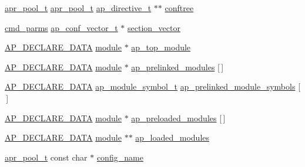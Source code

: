 \begin{DoxyCompactItemize}
\hyperlink{structapr__pool__t}{apr\+\_\+pool\+\_\+t} \hyperlink{structapr__pool__t}{apr\+\_\+pool\+\_\+t} \hyperlink{structap__directive__t}{ap\+\_\+directive\+\_\+t} $\ast$$\ast$ \hyperlink{group__APACHE__CORE__CONFIG_gafb5c2ed2ff2c064ef1b2c1f8bf52e112}{conftree}
\item 
\hyperlink{group__APACHE__CORE__CONFIG_ga1791fbd28d06a9847bad001541c5241e}{cmd\+\_\+parms} \hyperlink{group__APACHE__CORE__CONFIG_ga614684670dbf748a70ac6bad272da59c}{ap\+\_\+conf\+\_\+vector\+\_\+t} $\ast$ \hyperlink{group__APACHE__CORE__CONFIG_gace60c7b728bdd9607d750e86cf9414c9}{section\+\_\+vector}
\item 
\hyperlink{ap__config_8h_a0bb4c3adf74510a0dcdad5b125725fe0}{A\+P\+\_\+\+D\+E\+C\+L\+A\+R\+E\+\_\+\+D\+A\+TA} \hyperlink{group__APACHE__CORE__CONFIG_ga0ea4f633a5f9f88e1603aaeb1f2b2e69}{module} $\ast$ \hyperlink{group__APACHE__CORE__CONFIG_ga8bd7e52603c1c656680cd98c5d3ae1db}{ap\+\_\+top\+\_\+module}
\item 
\hyperlink{ap__config_8h_a0bb4c3adf74510a0dcdad5b125725fe0}{A\+P\+\_\+\+D\+E\+C\+L\+A\+R\+E\+\_\+\+D\+A\+TA} \hyperlink{group__APACHE__CORE__CONFIG_ga0ea4f633a5f9f88e1603aaeb1f2b2e69}{module} $\ast$ \hyperlink{group__APACHE__CORE__CONFIG_gaee5bc5635e112a8e591fdd10c3797cda}{ap\+\_\+prelinked\+\_\+modules} \mbox{[}$\,$\mbox{]}
\item 
\hyperlink{ap__config_8h_a0bb4c3adf74510a0dcdad5b125725fe0}{A\+P\+\_\+\+D\+E\+C\+L\+A\+R\+E\+\_\+\+D\+A\+TA} \hyperlink{structap__module__symbol__t}{ap\+\_\+module\+\_\+symbol\+\_\+t} \hyperlink{group__APACHE__CORE__CONFIG_ga314ce3105e678fe1f2e49e53caa1807d}{ap\+\_\+prelinked\+\_\+module\+\_\+symbols} \mbox{[}$\,$\mbox{]}
\item 
\hyperlink{ap__config_8h_a0bb4c3adf74510a0dcdad5b125725fe0}{A\+P\+\_\+\+D\+E\+C\+L\+A\+R\+E\+\_\+\+D\+A\+TA} \hyperlink{group__APACHE__CORE__CONFIG_ga0ea4f633a5f9f88e1603aaeb1f2b2e69}{module} $\ast$ \hyperlink{group__APACHE__CORE__CONFIG_ga171aecd16a905807fb052acd9077888a}{ap\+\_\+preloaded\+\_\+modules} \mbox{[}$\,$\mbox{]}
\item 
\hyperlink{ap__config_8h_a0bb4c3adf74510a0dcdad5b125725fe0}{A\+P\+\_\+\+D\+E\+C\+L\+A\+R\+E\+\_\+\+D\+A\+TA} \hyperlink{group__APACHE__CORE__CONFIG_ga0ea4f633a5f9f88e1603aaeb1f2b2e69}{module} $\ast$$\ast$ \hyperlink{group__APACHE__CORE__CONFIG_ga946d6c71aebf86554509cae52c588da8}{ap\+\_\+loaded\+\_\+modules}
\item 
\hyperlink{structapr__pool__t}{apr\+\_\+pool\+\_\+t} const char $\ast$ \hyperlink{group__APACHE__CORE__CONFIG_ga7091e2a62ce17dbe9a86c121ec873dc7}{config\+\_\+name}

\end{DoxyCompactItemize}
